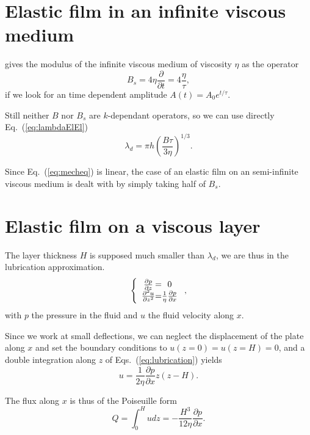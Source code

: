 \documentclass[12pt,a4paper]{revtex4}
\begin{document}
\section{Elastic film in an infinite viscous medium}

\citet{Biot1957} gives the modulus of the infinite viscous medium of viscosity $\eta$ as the operator
\begin{equation}
B_s = 4\eta\frac{\partial}{\partial t} = 4\frac{\eta}{\tau},
\end{equation}
if we look for an time dependent amplitude $A(t)= A_0 e^{t/\tau}$.

Still neither $B$ nor $B_s$ are $k$-dependant operators, so we can use directly Eq.~(\ref{eq:lambdaElEl})
\begin{equation}
\lambda_d = \pi h \left(\frac{B\tau}{3\eta}\right)^{1/3}.
\end{equation}

Since Eq.~(\ref{eq:mecheq}) is linear, the case of an elastic film on an semi-infinite viscous medium is dealt with by simply taking half of $B_s$.

\section{Elastic film on a viscous layer}
The layer thickness $H$ is supposed much smaller than $\lambda_d$, we are thus in the lubrication approximation.
\begin{equation}
\left \{
\begin{array}{c @{=} c}
	\frac{\partial p}{\partial z} & 0\\
	\frac{\partial^2 u}{\partial z^2} & \frac{1}{\eta}\frac{\partial p}{\partial x}
\end{array}
\right.,
\label{eq:lubrication}
\end{equation}
with $p$ the pressure in the fluid and $u$ the fluid velocity along $x$.

Since we work at small deflections, we can neglect the displacement of the plate along $x$ and set the boundary conditions to $u(z=0) = u(z=H) = 0$, and a double integration along $z$ of Eqs.~(\ref{eq:lubrication}) yields
\begin{equation}
u = \frac{1}{2\eta}\frac{\partial p}{\partial x}z(z-H).
\end{equation}

The flux along $x$ is thus of the Poiseuille form
\begin{equation}
Q = \int_0^H u dz = -\frac{H^3}{12\eta}\frac{\partial p}{\partial x}.
\label{eq:PoiseuilleFlux}
\end{equation}
\end{document}
